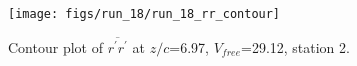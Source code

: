 \begin{figure}[H]
\centering
\texttt{[image: figs/run\_18/run\_18\_rr\_contour]}
\caption{Contour plot of $\overline{r^\prime r^\prime}$ at $z/c$=6.97, $V_{free}$=29.12, station 2.}
\label{fig:run_18_rr_contour}
\end{figure}


